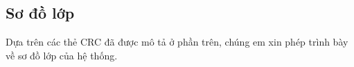 \subsection{Sơ đồ lớp}
  Dựa trên các thẻ CRC đã được mô tả ở phần trên, chúng em xin phép trình bày về sơ đồ lớp của hệ thống.

